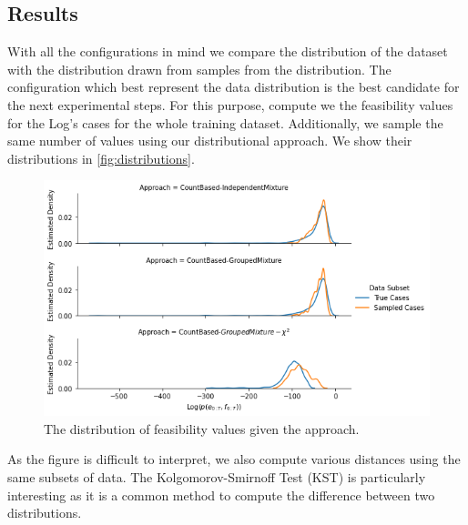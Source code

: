 \documentclass[./../../paper.tex]{subfiles}
\begin{document}
\subsection{Results}
With all the configurations in mind we compare the distribution of the dataset with the distribution drawn from samples from the distribution. The configuration which best represent the data distribution is the best candidate for the next experimental steps. For this purpose, compute we the feasibility values for the Log's cases for the whole training dataset. Additionally, we sample the same number of values using our distributional approach. We show their distributions in \autoref{fig:distributions}.


\begin{figure}
    \centering
    \includegraphics[width=\textwidth]{figures/results/result_distributions.png}
    \caption{The distribution of feasibility values given the approach.}
    \label{fig:distributions}
\end{figure}

As the figure is difficult to interpret, we also compute various distances using the same subsets of data. The Kolgomorov-Smirnoff Test (KST) is particularly interesting as it is a common method to compute the difference between two distributions.
\end{document}
